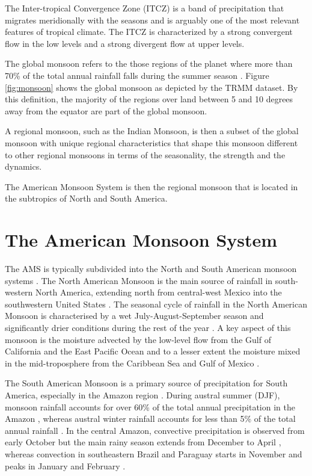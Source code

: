 The Inter-tropical Convergence Zone (ITCZ) is a band of precipitation that migrates meridionally with the seasons and is arguably one of the most relevant features of tropical climate. The ITCZ is characterized by a strong convergent flow in the low levels and a strong divergent flow at upper levels. 

The global monsoon refers to the those regions of the planet where more than 70\% of the total annual rainfall falls during the summer season \citep{zhou2016,wang2017}.
Figure \ref{fig:monsoon} shows the global monsoon as depicted by the TRMM dataset. By this definition, the majority of the regions over land between 5 and 10 degrees away from the equator are part of the global monsoon.

A regional monsoon, such as the Indian Monsoon, is then a subset of the global monsoon with unique regional characteristics that shape this monsoon different to other regional monsoons in terms of the seasonality, the strength and the dynamics. 

The American Monsoon System is then the regional monsoon that is located in the subtropics of North and South America. 
\section{The American Monsoon System}\label{sq:bk_ams}

The AMS is typically subdivided into the North and South American monsoon systems \citep{vera2006}.
The North American Monsoon is the main source of rainfall in south-western North America, extending north from central-west Mexico into the southwestern United States \citep{adams1997,stensrud1997,vera2006}.
 The seasonal cycle of rainfall in the North American Monsoon is characterised by a wet July-August-September season and significantly drier conditions during the rest of the year \citep{adams1997}.
A key aspect of this monsoon is the moisture advected by the low-level flow from the Gulf of California and the East Pacific Ocean and to a lesser extent the moisture mixed in the mid-troposphere from the Caribbean Sea and Gulf of Mexico \citep[e.g][]{stensrud1997,pascale2016,ordonez2019}.

The South American Monsoon is a primary source of precipitation for South America, especially in the Amazon region \citep{gan2004,vera2006,jones2013}.
During austral summer (DJF), monsoon rainfall accounts for over 60\% of the total annual precipitation in the Amazon \citep{gan2004,marengo2012}, whereas
austral winter rainfall accounts for less than 5\% of the total annual rainfall \citep{vera2006}.
In the central Amazon, convective precipitation is observed from early October but the main rainy season extends from December to April \citep{machado2004,adams2013}, whereas convection in southeastern Brazil and Paraguay starts in November and peaks in January and February \citep{marengo2001,nieto2011}. 

